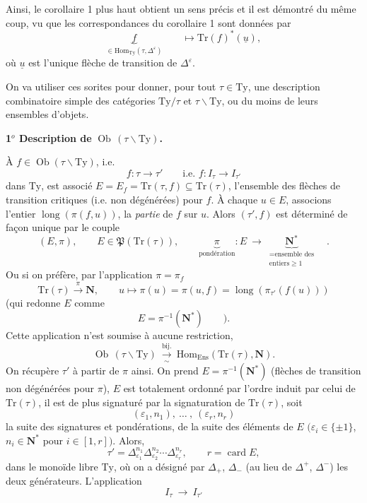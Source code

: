 \documentclass[11pt]{article}
\newcommand{\printedpage}[1]{\marginpar{\footnotesize p.~#1}}
\newcommand{\msp}[1]{\marginpar{\footnotesize [#1]}}
\newcommand{\Ob}{\operatorname{Ob}}
\newcommand{\Hom}{\mathrm{Hom}}
\newcommand{\Ty}{\mathrm{Ty}}
\newcommand{\Tr}{\mathrm{Tr}}
\newcommand{\lng}{\operatorname{long}}
\newcommand{\card}{\operatorname{card}}
\begin{document}
\printedpage{28}

Ainsi, le corollaire 1 plus haut obtient un sens précis et il est démontré du même coup, vu que les correspondances du corollaire 1 sont données par
\[
\underbrace{f}_{\in \Hom_{\Ty}(\tau, \Delta^{\varepsilon})} \qquad \longmapsto \Tr(f)^*(\underline{u}),
\]
où $\underline{u}$ est l'unique flèche de transition de $\Delta^{\varepsilon}$.

On va utiliser ces sorites pour donner, pour tout $\tau \in \Ty$, une description combinatoire simple des catégories $\Ty/\tau$ et $\tau\backslash\Ty$, ou du moins de leurs ensembles d'objets.

\textbf{1$^o$ Description de} $\Ob\,(\tau\backslash\Ty)$\textbf{.}

À $f \in \Ob(\tau\backslash\Ty)$, i.e.
\[
f : \tau \longrightarrow \tau' \qquad \text{i.e. } f : I_\tau \longrightarrow I_{\tau'}
\]
dans $\Ty$, est associé $E = E_f = \Tr(\tau, f) \subseteq \Tr(\tau)$, l'ensemble des flèches de transition critiques (i.e. non dégénérées) pour $f$. À chaque $u \in E$, associons l'entier $\lng(\pi(f, u))$,
\msp{page 44}
la \textit{partie} de $f$ sur $u$. Alors $(\tau', f)$ est déterminé de façon unique par le couple
\[
(E, \pi), \qquad E \in \mathfrak{P}(\Tr(\tau)), \qquad \underbrace{\pi}_{\text{pondération}} : E \ \longrightarrow\ \underbrace{\mathbf{N}^*}_{\substack{= \text{ensemble des} \\ \text{entiers} \geq 1}} \quad .
\]
Ou si on préfère, par l'application $\pi = \pi_f$
\[
\Tr(\tau) \xrightarrow{\pi} \mathbf{N}, \qquad u \longmapsto \pi(u) = \pi(u, f) = \lng(\pi_{\tau'}(f(u)))
\]
(qui redonne $E$ comme
\[
E = \pi^{-1}(\mathbf{N}^*) \qquad ).
\]
Cette application n'est soumise à aucune restriction,
\[
\Ob\,(\tau\backslash\Ty) \ \xrightarrow[\sim]{\text{bij.}}\ \Hom_{\mathrm{Ens}}(\Tr(\tau), \mathbf{N}).
\]
On récupère $\tau'$ à partir de $\pi$ ainsi. On prend $E = \pi^{-1}(\mathbf{N}^*)$ (flèches de transition non dégénérées pour $\pi$), $E$ est totalement ordonné par l'ordre induit par celui de $\Tr(\tau)$, il est de plus signaturé par la signaturation de $\Tr(\tau)$, soit
\[
(\varepsilon_1, n_1),\ \dots\ ,\ (\varepsilon_r, n_r)
\]
la suite des signatures et pondérations, de la suite des éléments de $E$ $(\varepsilon_i \in \{\pm 1\}$, $n_i \in \mathbf{N}^*$ pour $i \in [1, r])$. Alors,
\[
\tau' = \Delta_{\varepsilon_1}^{n_1} \Delta_{\varepsilon_2}^{n_2} \cdots \Delta_{\varepsilon_r}^{n_r}, \qquad r = \card E,
\]
dans le monoïde libre $\mathrm{Ty}$, où on a désigné par $\Delta_+$, $\Delta_-$ (au lieu de $\Delta^+$, $\Delta^-$) les deux générateurs. L'application
\[
I_\tau \ \longrightarrow\ I_{\tau'}
\]
\end{document}
